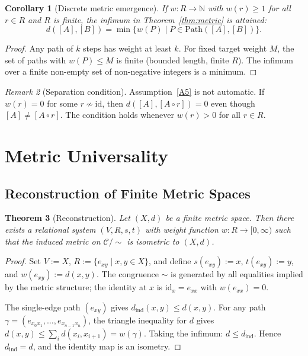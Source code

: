 \documentclass{article}
\newtheorem{theorem}{Theorem}[section]
\newtheorem{corollary}[theorem]{Corollary}
\theoremstyle{definition}
\theoremstyle{remark}
\newtheorem{remark}[theorem]{Remark}
\newcommand{\RC}{\mathcal{C}}
\newcommand{\id}{\mathrm{id}}
\begin{document}
\begin{corollary}[Discrete metric emergence]
\label{cor:discrete_metric}
If $w : R \to \mathbb{N}$ with $w(r) \geq 1$ for all $r \in R$
and $R$ is finite, the infimum in Theorem~\ref{thm:metric} is
attained:
\[
  d([A],[B]) = \min\bigl\{ w(P) \mid P \in \mathrm{Path}([A],[B])\bigr\}.
\]
\end{corollary}

\begin{proof}
Any path of $k$ steps has weight at least $k$. For fixed target
weight $M$, the set of paths with $w(P) \leq M$ is finite (bounded
length, finite $R$). The infimum over a finite non-empty set of
non-negative integers is a minimum.
\end{proof}

\begin{remark}[Separation condition]
\label{rem:separation}
Assumption~\ref{A5} is not automatic. If $w(r) = 0$ for some
$r \not\sim \id$, then $d([A],[A \circ r]) = 0$ even though
$[A] \neq [A \circ r]$. The condition holds whenever $w(r) > 0$
for all $r \in R$.
\end{remark}

\section{Metric Universality}
\label{sec:universality}

\subsection{Reconstruction of Finite Metric Spaces}

\begin{theorem}[Reconstruction]
\label{thm:reconstruction}
Let $(X, d)$ be a finite metric space. Then there exists a
relational system $(V, R, s, t)$ with weight function
$w : R \to [0,\infty)$ such that the induced metric on
$\RC/{\sim}$ is isometric to $(X, d)$.
\end{theorem}

\begin{proof}
Set $V := X$, $R := \{e_{xy} \mid x, y \in X\}$, and define
$s(e_{xy}) := x$, $t(e_{xy}) := y$, and $w(e_{xy}) := d(x,y)$.
The congruence $\sim$ is generated by all equalities implied by
the metric structure; the identity at $x$ is $\id_x = e_{xx}$
with $w(e_{xx}) = 0$.

The single-edge path $(e_{xy})$ gives
$d_{\mathrm{ind}}(x,y) \leq d(x,y)$.
For any path $\gamma = (e_{x_0 x_1}, \dots, e_{x_{n-1}x_n})$,
the triangle inequality for $d$ gives
$d(x,y) \leq \sum_i d(x_i, x_{i+1}) = w(\gamma)$.
Taking the infimum: $d \leq d_{\mathrm{ind}}$.
Hence $d_{\mathrm{ind}} = d$, and the identity map is an isometry.
\end{proof}
\end{document}
